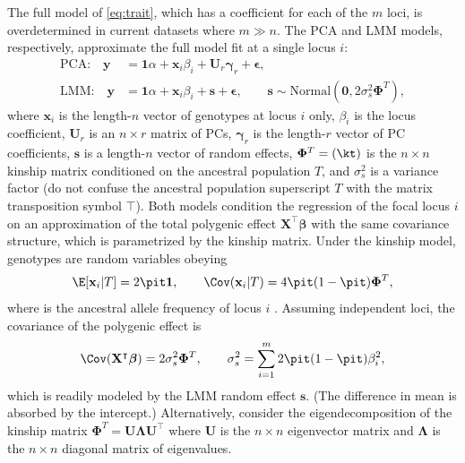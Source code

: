 \documentclass[11pt]{article}
\begin{document}
The full model of \cref{eq:trait}, which has a coefficient for each of the $m$ loci, is overdetermined in current datasets where $m \gg n$.
The PCA and LMM models, respectively, approximate the full model fit at a single locus $i$:
\begin{align}
  \label{eq:pca_gwas}
  \text{PCA:}\quad
  \mathbf{y}
  &=
  \mathbf{1} \alpha + \mathbf{x}_i \beta_i + \mathbf{U}_r \boldsymbol{\gamma}_r + \boldsymbol{\epsilon}
  , \\
  \label{eq:lmm_gwas}
  \text{LMM:}\quad
  \mathbf{y}
  &=
  \mathbf{1} \alpha + \mathbf{x}_i \beta_i + \mathbf{s} + \boldsymbol{\epsilon}
    ,
    \quad\quad
    \mathbf{s} \sim \text{Normal} \left( \mathbf{0}, 2 \sigma^2_s \mathbf{\Phi}^T \right),
\end{align}
where $\mathbf{x}_i$ is the length-$n$ vector of genotypes at locus $i$ only,
$\beta_i$ is the locus coefficient,
$\mathbf{U}_r$ is an $n \times r$ matrix of PCs,
$\boldsymbol{\gamma}_r$ is the length-$r$ vector of PC coefficients,
$\mathbf{s}$ is a length-$n$ vector of random effects,
$\mathbf{\Phi}^T = (\kt)$ is the $n \times n$ kinship matrix conditioned on the ancestral population $T$,
and $\sigma^2_s$ is a variance factor (do not confuse the ancestral population superscript $T$ with the matrix transposition symbol $\intercal$).
Both models condition the regression of the focal locus $i$ on an approximation of the total polygenic effect $\mathbf{X}^\intercal \boldsymbol{\beta}$ with the same covariance structure, which is parametrized by the kinship matrix.
Under the kinship model, genotypes are random variables obeying
\begin{equation}
  \label{eq:kinship_model}
\E[ \mathbf{x}_i | T ]
=
2 \pit \mathbf{1},
\quad\quad
\Cov( \mathbf{x}_i | T )
=
4 \pit ( 1 - \pit ) \mathbf{\Phi}^T,
\end{equation}
where \pit is the ancestral allele frequency of locus $i$ \citep{malecot_mathematiques_1948, wright_genetical_1951, jacquard_structures_1970, astle_population_2009}.
Assuming independent loci, the covariance of the polygenic effect is
$$
\Cov( \mathbf{X}^\intercal \boldsymbol{\beta} ) = 2 \sigma^2_s \mathbf{\Phi}^T,
\quad\quad
\sigma^2_s = \sum_{i=1}^m 2 \pit ( 1 - \pit ) \beta_i^2,
$$
which is readily modeled by the LMM random effect $\mathbf{s}$.
(The difference in mean is absorbed by the intercept.)
Alternatively, consider the eigendecomposition of the kinship matrix $\mathbf{\Phi}^T = \mathbf{U} \mathbf{\Lambda} \mathbf{U}^\intercal$ where $\mathbf{U}$ is the $n \times n$ eigenvector matrix and $\mathbf{\Lambda}$ is the $n \times n$ diagonal matrix of eigenvalues.
\end{document}
